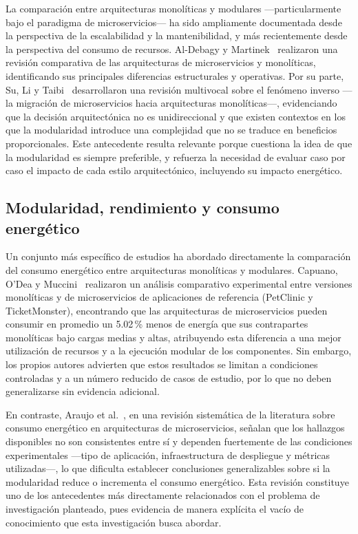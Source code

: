 La comparación entre arquitecturas monolíticas y modulares ---particularmente bajo el paradigma de microservicios--- ha sido ampliamente documentada desde la perspectiva de la escalabilidad y la mantenibilidad, y más recientemente desde la perspectiva del consumo de recursos. Al-Debagy y Martinek~\cite{aldebagy2018comparative} realizaron una revisión comparativa de las arquitecturas de microservicios y monolíticas, identificando sus principales diferencias estructurales y operativas. Por su parte, Su, Li y Taibi~\cite{su2024microservice} desarrollaron una revisión multivocal sobre el fenómeno inverso ---la migración de microservicios hacia arquitecturas monolíticas---, evidenciando que la decisión arquitectónica no es unidireccional y que existen contextos en los que la modularidad introduce una complejidad que no se traduce en beneficios proporcionales. Este antecedente resulta relevante porque cuestiona la idea de que la modularidad es siempre preferible, y refuerza la necesidad de evaluar caso por caso el impacto de cada estilo arquitectónico, incluyendo su impacto energético.

\subsection{Modularidad, rendimiento y consumo energético}

Un conjunto más específico de estudios ha abordado directamente la comparación del consumo energético entre arquitecturas monolíticas y modulares. Capuano, O'Dea y Muccini~\cite{capuano2026comparative} realizaron un análisis comparativo experimental entre versiones monolíticas y de microservicios de aplicaciones de referencia (PetClinic y TicketMonster), encontrando que las arquitecturas de microservicios pueden consumir en promedio un 5.02\,\% menos de energía que sus contrapartes monolíticas bajo cargas medias y altas, atribuyendo esta diferencia a una mejor utilización de recursos y a la ejecución modular de los componentes. Sin embargo, los propios autores advierten que estos resultados se limitan a condiciones controladas y a un número reducido de casos de estudio, por lo que no deben generalizarse sin evidencia adicional.

En contraste, Araujo et al.~\cite{araujo2024energy}, en una revisión sistemática de la literatura sobre consumo energético en arquitecturas de microservicios, señalan que los hallazgos disponibles no son consistentes entre sí y dependen fuertemente de las condiciones experimentales ---tipo de aplicación, infraestructura de despliegue y métricas utilizadas---, lo que dificulta establecer conclusiones generalizables sobre si la modularidad reduce o incrementa el consumo energético. Esta revisión constituye uno de los antecedentes más directamente relacionados con el problema de investigación planteado, pues evidencia de manera explícita el vacío de conocimiento que esta investigación busca abordar.


